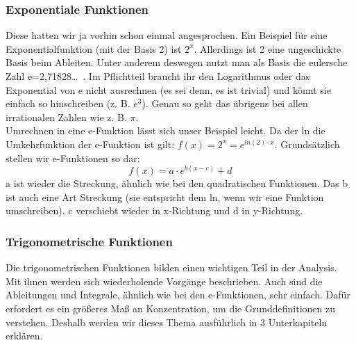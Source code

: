 	\subsubsection{Exponentiale Funktionen}
Diese hatten wir ja vorhin schon einmal angesprochen. Ein Beispiel für eine Exponentialfunktion (mit der Basis 2) ist \(2^x\). Allerdings ist 2 eine ungeschickte Basis beim Ableiten. Unter anderem deswegen nutzt man als Basis die eulersche Zahl e=2,71828\ldots \ . Im Pflichtteil braucht ihr den Logarithmus oder das Exponential von e nicht ausrechnen (es sei denn, es ist trivial) und könnt sie einfach so hinschreiben (z. B. \(e^3\)). Genau so geht das übrigens bei allen irrationalen Zahlen wie z. B. \(\pi\).\\
Umrechnen in eine e-Funktion lässt sich unser Beispiel leicht. Da der ln die Umkehrfunktion der e-Funktion ist gilt: \(f(x)=2^x=e^{ln(2)\cdot x}\). Grundsätzlich stellen wir e-Funktionen so dar:
\[f(x)=a \cdot e^{b(x-c)}+d\]
a ist wieder die Streckung, ähnlich wie bei den quadratischen Funktionen. Das b ist auch eine Art Streckung (sie entspricht dem ln, wenn wir eine Funktion umschreiben). c verschiebt wieder in x-Richtung und d in y-Richtung.\\

	\subsubsection{Trigonometrische Funktionen}
Die trigonometrischen Funktionen bilden einen wichtigen Teil in der Analysis. Mit ihnen werden sich wiederholende Vorgänge beschrieben. Auch sind die Ableitungen und Integrale, ähnlich wie bei den e-Funktionen, sehr einfach. Dafür erfordert es ein größeres Maß an Konzentration, um die Grunddefinitionen zu verstehen. Deshalb werden wir dieses Thema ausführlich in 3 Unterkapiteln erklären.
